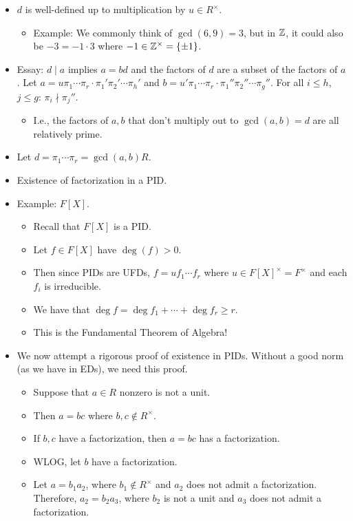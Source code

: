 \documentclass[../notes.tex]{subfiles}
\begin{document}
\begin{itemize}
\begin{enumerate}[label={(\roman*)}]
    \end{enumerate}
    \item $d$ is well-defined up to multiplication by $u\in R^\times$.
    \begin{itemize}
        \item Example: We commonly think of $\gcd(6,9)=3$, but in $\mathbb{Z}$, it could also be $-3=-1\cdot 3$ where $-1\in\mathbb{Z}^\times=\{\pm 1\}$.
    \end{itemize}
    \item Essay: $d\mid a$ implies $a=bd$ and the factors of $d$ are a subset of the factors of $a$. Let $a=u\pi_1\cdots\pi_r\cdot\pi_1'\pi_2'\cdots\pi_h'$ and $b=u'\pi_1\cdots\pi_r\cdot\pi_1''\pi_2''\cdots\pi_g''$. For all $i\leq h$, $j\leq g$: $\pi_i\nmid\pi_j''$.
    \begin{itemize}
        \item I.e., the factors of $a,b$ that don't multiply out to $\gcd(a,b)=d$ are all relatively prime.
    \end{itemize}
    \item Let $d=\pi_1\cdots\pi_r=\gcd(a,b)R$.
    \item Existence of factorization in a PID.
    \item Example: $F[X]$.
    \begin{itemize}
        \item Recall that $F[X]$ is a PID.
        \item Let $f\in F[X]$ have $\deg(f)>0$.
        \item Then since PIDs are UFDs, $f=uf_1\cdots f_r$ where $u\in F[X]^\times=F^\times$ and each $f_i$ is irreducible.
        \item We have that $\deg f=\deg f_1+\cdots+\deg f_r\geq r$.
        \item This is the Fundamental Theorem of Algebra!
    \end{itemize}
    \item We now attempt a rigorous proof of existence in PIDs. Without a good norm (as we have in EDs), we need this proof.
    \begin{itemize}
        \item Suppose that $a\in R$ nonzero is not a unit.
        \item Then $a=bc$ where $b,c\notin R^\times$.
        \item If $b,c$ have a factorization, then $a=bc$ has a factorization.
        \item WLOG, let $b$ have a factorization.
        \item Let $a=b_1a_2$, where $b_1\notin R^\times$ and $a_2$ does not admit a factorization. Therefore, $a_2=b_2a_3$, where $b_2$ is not a unit and $a_3$ does not admit a factorization.

\end{itemize}
\end{itemize}
\end{document}
